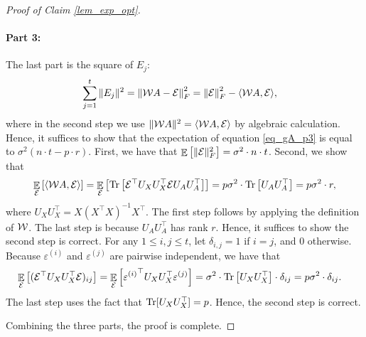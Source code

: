 \begin{proof}[Proof of Claim \ref{lem_exp_opt}]
	\paragraph{Part 3:} The last part is the square of $E_j$:
	\begin{align}\label{eq_gA_p3}
		\sum_{j=1}^t \|E_j\|^2 &= \left\| {\mathcal W} A - \mathcal{E} \right\|_{F}^2
		= \left\| \mathcal{E} \right\|_{F}^2 - \langle {\mathcal W} A, \mathcal{E} \rangle,
	\end{align}
	where in the second step we use $\|{\mathcal W} A\|^2 = \langle {\mathcal W} A, \mathcal{E} \rangle$ by algebraic calculation.
	Hence, it suffices to show that the expectation of equation \eqref{eq_gA_p3} is equal to $\sigma^2 (n\cdot t - p\cdot r)$.
	First, we have that $\mathop{\mathbb{E}}\left[ \|\mathcal{E}\|_F^2 \right] = \sigma^2 \cdot n \cdot t$.
	Second, we show that
	\begin{align*}
		\mathop{\mathbb{E}}_{\mathcal{E}}\left[  \langle {\mathcal W} A, \mathcal{E} \rangle \right] =\mathop{\mathbb{E}}_{\mathcal{E}}\left[ \operatorname{Tr}\left[\mathcal E^\top U_X U_X^\top \mathcal E U_AU_A^\top\right]  \right]= p\sigma^2 \cdot \operatorname{Tr}\left[ U_AU_A^\top\right] =  p \sigma^2 \cdot r,
	\end{align*}
	where $U_XU_X^\top = X(X^{\top} X)^{-1} X^{\top}$.
	The first step follows by applying the definition of ${\mathcal W}$.
	The last step is because $U_AU_A^\top$ has rank $r$.
	Hence, it suffices to show the second step is correct.
	For any $1\le i, j \le t$, let $\delta_{i, j} = 1$ if $i = j$, and $0$ otherwise.
	Because $\varepsilon^{(i)}$ and $\varepsilon^{(j)}$ are pairwise independent, we have that
	\begin{align*}
			 \mathop{\mathbb{E}}_{\mathcal{E}}\left[ (\mathcal{E}^{\top}U_XU_X^\top \mathcal{E})_{ij}  \right]
		&= \mathop{\mathbb{E}}_{\mathcal{E}}\left[ {\varepsilon^{(i)}}^\top U_X U_X^\top  \varepsilon^{(j)}  \right] = \sigma^2 \cdot \operatorname{Tr}\left[U_XU_X^\top \right] \cdot \delta_{ij} = p\sigma^2 \cdot \delta_{ij}.
	\end{align*}
	The last step uses the fact that $\operatorname{Tr}[U_XU_X^\top] = p$.
	Hence, the second step is correct.

	Combining the three parts, the proof is complete.
	\end{proof}
	
